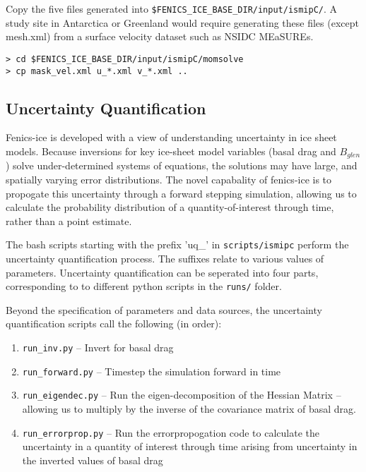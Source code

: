 \documentclass[11pt, reqno, nocenter]{article}
\begin{document}
Copy the five files generated into {\tt \$FENICS\_ICE\_BASE\_DIR/input/ismipC/}. A study site in Antarctica or Greenland would require generating these files (except mesh.xml) from a surface velocity dataset such as NSIDC MEaSUREs.

\begin{verbatim}
> cd $FENICS_ICE_BASE_DIR/input/ismipC/momsolve
> cp mask_vel.xml u_*.xml v_*.xml ..
\end{verbatim}

\subsection{Uncertainty Quantification}

Fenics-ice is developed with a view of understanding uncertainty in ice sheet models. Because inversions for key ice-sheet model variables (basal drag and $B_{glen}$) solve under-determined systems of equations, the solutions may have large, and spatially varying error distributions. The novel capabality of fenics-ice is to propogate this uncertainty through a forward stepping simulation, allowing us to calculate the probability distribution of a quantity-of-interest through time, rather than a point estimate. 

The bash scripts starting with the prefix 'uq\_' in {\tt scripts/ismipc} perform the uncertainty quantification process. The suffixes relate to various values of parameters. Uncertainty quantification can be seperated into four parts, corresponding to to different python scripts in the {\tt runs/} folder.

Beyond the specification of parameters and data sources, the uncertainty quantification scripts call the following (in order):

\begin{enumerate}
	\item {\tt run\_inv.py} -- Invert for basal drag
	\item {\tt run\_forward.py} -- Timestep the simulation forward in time
	\item {\tt run\_eigendec.py} -- Run the eigen-decomposition of the Hessian Matrix -- allowing us to multiply by the inverse of the covariance matrix of basal drag.
	\item {\tt run\_errorprop.py} -- Run the errorpropogation code to calculate the uncertainty in a quantity of interest through time arising from uncertainty in the inverted values of basal drag
\end{enumerate}
\end{document}
